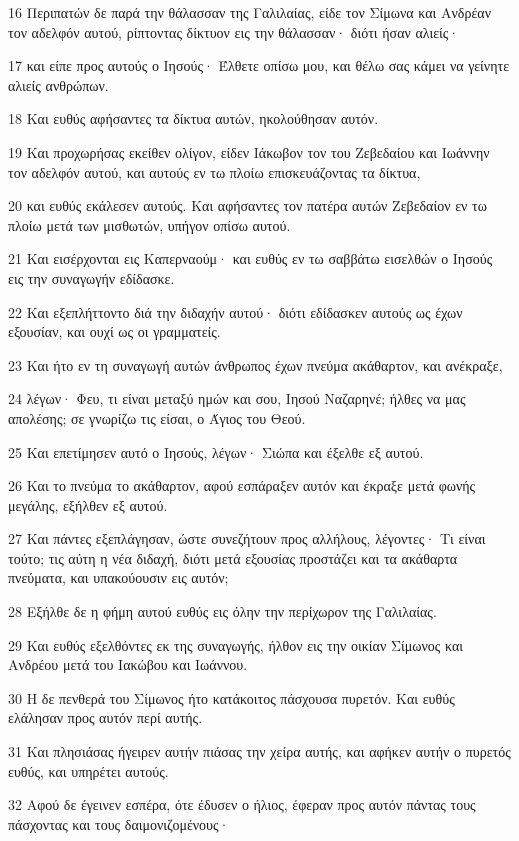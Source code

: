 \par 16 Περιπατών δε παρά την θάλασσαν της Γαλιλαίας, είδε τον Σίμωνα και Ανδρέαν τον αδελφόν αυτού, ρίπτοντας δίκτυον εις την θάλασσαν· διότι ήσαν αλιείς·
\par 17 και είπε προς αυτούς ο Ιησούς· Έλθετε οπίσω μου, και θέλω σας κάμει να γείνητε αλιείς ανθρώπων.
\par 18 Και ευθύς αφήσαντες τα δίκτυα αυτών, ηκολούθησαν αυτόν.
\par 19 Και προχωρήσας εκείθεν ολίγον, είδεν Ιάκωβον τον του Ζεβεδαίου και Ιωάννην τον αδελφόν αυτού, και αυτούς εν τω πλοίω επισκευάζοντας τα δίκτυα,
\par 20 και ευθύς εκάλεσεν αυτούς. Και αφήσαντες τον πατέρα αυτών Ζεβεδαίον εν τω πλοίω μετά των μισθωτών, υπήγον οπίσω αυτού.
\par 21 Και εισέρχονται εις Καπερναούμ· και ευθύς εν τω σαββάτω εισελθών ο Ιησούς εις την συναγωγήν εδίδασκε.
\par 22 Και εξεπλήττοντο διά την διδαχήν αυτού· διότι εδίδασκεν αυτούς ως έχων εξουσίαν, και ουχί ως οι γραμματείς.
\par 23 Και ήτο εν τη συναγωγή αυτών άνθρωπος έχων πνεύμα ακάθαρτον, και ανέκραξε,
\par 24 λέγων· Φευ, τι είναι μεταξύ ημών και σου, Ιησού Ναζαρηνέ; ήλθες να μας απολέσης; σε γνωρίζω τις είσαι, ο Άγιος του Θεού.
\par 25 Και επετίμησεν αυτό ο Ιησούς, λέγων· Σιώπα και έξελθε εξ αυτού.
\par 26 Και το πνεύμα το ακάθαρτον, αφού εσπάραξεν αυτόν και έκραξε μετά φωνής μεγάλης, εξήλθεν εξ αυτού.
\par 27 Και πάντες εξεπλάγησαν, ώστε συνεζήτουν προς αλλήλους, λέγοντες· Τι είναι τούτο; τις αύτη η νέα διδαχή, διότι μετά εξουσίας προστάζει και τα ακάθαρτα πνεύματα, και υπακούουσιν εις αυτόν;
\par 28 Εξήλθε δε η φήμη αυτού ευθύς εις όλην την περίχωρον της Γαλιλαίας.
\par 29 Και ευθύς εξελθόντες εκ της συναγωγής, ήλθον εις την οικίαν Σίμωνος και Ανδρέου μετά του Ιακώβου και Ιωάννου.
\par 30 Η δε πενθερά του Σίμωνος ήτο κατάκοιτος πάσχουσα πυρετόν. Και ευθύς ελάλησαν προς αυτόν περί αυτής.
\par 31 Και πλησιάσας ήγειρεν αυτήν πιάσας την χείρα αυτής, και αφήκεν αυτήν ο πυρετός ευθύς, και υπηρέτει αυτούς.
\par 32 Αφού δε έγεινεν εσπέρα, ότε έδυσεν ο ήλιος, έφεραν προς αυτόν πάντας τους πάσχοντας και τους δαιμονιζομένους·
